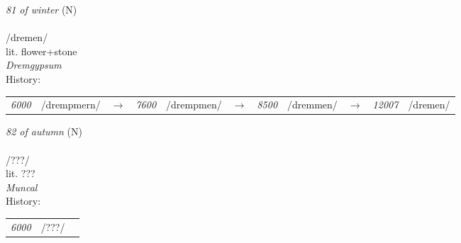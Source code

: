 \vspace{15pt}
\begin{nopagebreak}
 \textit{81 of winter} (N)\\
\\
\noindent /dr{\textprimstress}emen/\\
\noindent lit. flower+stone\\
\noindent \textit{Dremgypsum}\\


\noindent History:

\vspace{-0pt}
\hspace{40pt}
\begin{tabular}{ccc}
\textit{6000} & /drempmern/&$\rightarrow$ & \textit{7600} & /drempmen/&$\rightarrow$ & \textit{8500} & /dremmen/&$\rightarrow$ & \textit{12007} & /dremen/& \\
\end{tabular}

\vspace{20pt}\hline

\end{nopagebreak}
\filbreak



\vspace{15pt}
\begin{nopagebreak}
 \textit{82 of autumn} (N)\\
\\
\noindent /???/\\
\noindent lit. ???\\
\noindent \textit{Muncal}\\


\noindent History:

\vspace{-0pt}
\hspace{40pt}
\begin{tabular}{ccc}
\textit{6000} & /???/& \\
\end{tabular}

\vspace{20pt}\hline

\end{nopagebreak}
\filbreak



